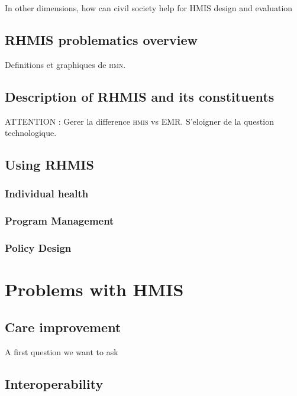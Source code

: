 \documentclass[a4paper,11pt,final,twoside]{article}
\begin{document}
In other dimensions, how can civil society help for HMIS design and evaluation


	\subsection{RHMIS problematics overview}

Definitions et graphiques de \textsc{hmn}.

	\subsection{Description of RHMIS and its constituents}

ATTENTION : Gerer la difference \textsc{hmis} vs EMR. S'eloigner de la question technologique. 

	\subsection{Using RHMIS}

		\subsubsection{Individual health}

		\subsubsection{Program Management}
		
		\subsubsection{Policy Design}

\section{Problems with HMIS}

	\subsection{Care improvement}

A first question we want to ask 

	\subsection{Interoperability}
\end{document}
